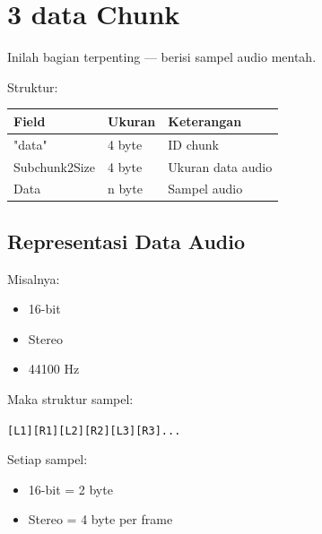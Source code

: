 \documentclass{article}
\begin{document}

\section*{3 data Chunk}

Inilah bagian terpenting --- berisi sampel audio mentah.

Struktur:

\begin{tabular}{|l|l|l|}
\hline
\textbf{Field} & \textbf{Ukuran} & \textbf{Keterangan} \\ \hline
"data" & 4 byte & ID chunk \\ \hline
Subchunk2Size & 4 byte & Ukuran data audio \\ \hline
Data & n byte & Sampel audio \\ \hline
\end{tabular}

\vspace{10mm}

\subsection*{Representasi Data Audio}

Misalnya:
\begin{itemize}
    \item 16-bit
    \item Stereo
    \item 44100 Hz
\end{itemize}

Maka struktur sampel:

\begin{center}
\texttt{[L1][R1][L2][R2][L3][R3]...}
\end{center}

Setiap sampel:
\begin{itemize}
    \item 16-bit = 2 byte
    \item Stereo = 4 byte per frame
\end{itemize}
\end{document}

